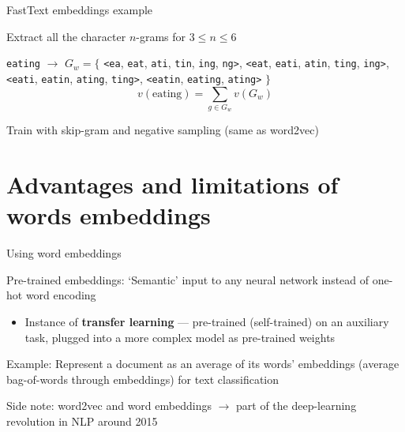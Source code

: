 \documentclass[12pt,aspectratio=169,handout]{beamer}
\begin{document}
\begin{frame}{FastText embeddings example}
	
Extract all the character $n$-grams for $3 \leq n \leq 6$

\begin{example}
\texttt{eating} $\to$ $G_w = \{$
\texttt{<ea}, \texttt{eat}, \texttt{ati}, \texttt{tin}, \texttt{ing}, \texttt{ng>},
\texttt{<eat}, \texttt{eati}, \texttt{atin}, \texttt{ting}, \texttt{ing>},
\texttt{<eati}, \texttt{eatin}, \texttt{ating}, \texttt{ting>},
\texttt{<eatin}, \texttt{eating}, \texttt{ating>} $\}$
$$
v(\text{eating}) = \sum_{g \in G_w} v(G_w)
$$
\end{example}

Train with skip-gram and negative sampling (same as word2vec)
	
	
\end{frame}

\section{Advantages and limitations of words embeddings}

\begin{frame}{Using word embeddings}

Pre-trained embeddings: `Semantic' input to any neural network instead of one-hot word encoding
\begin{itemize}
	\item Instance of \textbf{transfer learning} --- pre-trained (self-trained) on an auxiliary task, plugged into a more complex model as pre-trained weights
\end{itemize}

Example: Represent a document as an average of its words' embeddings (average bag-of-words through embeddings) for text classification

\bigskip

Side note: word2vec and word embeddings $\to$ part of the deep-learning revolution in NLP around 2015

\end{frame}
\end{document}
